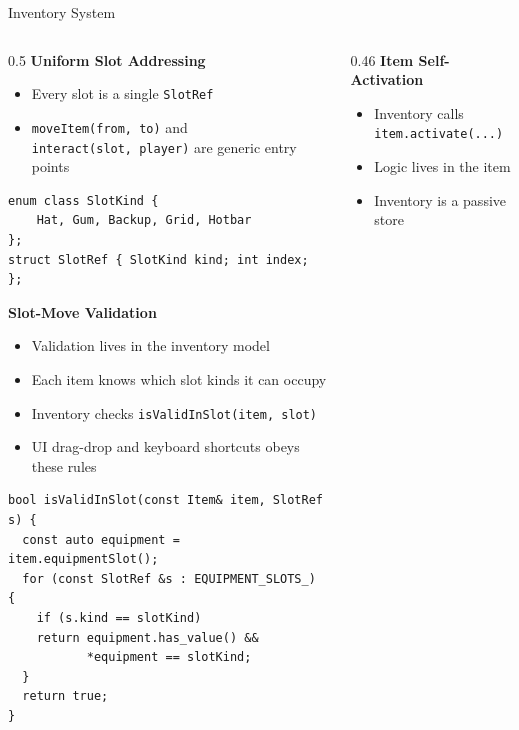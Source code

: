 \documentclass[11pt,t,usepdftitle=false,aspectratio=169]{beamer}
\begin{document}
\begin{frame}[fragile,shrink=30]{Inventory System}
	\lstset{basicstyle=\scriptsize\ttfamily}
	\begin{columns}[T]
		\begin{column}{0.5\textwidth}
			\small
			\textbf{Uniform Slot Addressing}
			\begin{itemize}
				\item Every slot is a single \texttt{SlotRef}
				\item \texttt{moveItem(from,~to)} and \texttt{interact(slot,~player)} are generic entry points
			\end{itemize}
			\vspace{-0.1em}
			\begin{lstlisting}
enum class SlotKind {
    Hat, Gum, Backup, Grid, Hotbar
};
struct SlotRef { SlotKind kind; int index; };
			\end{lstlisting}



			\vspace{0.5em}

			\textbf{Slot-Move Validation}
			\begin{itemize}
				\item Validation lives in the inventory model
				\item Each item knows which slot kinds it can occupy
				\item Inventory checks \texttt{isValidInSlot(item,~slot)}
				\item UI drag-drop and keyboard shortcuts obeys these rules
			\end{itemize}

			\vspace{-0.1em}
			\begin{lstlisting}
bool isValidInSlot(const Item& item, SlotRef s) {
  const auto equipment = item.equipmentSlot();
  for (const SlotRef &s : EQUIPMENT_SLOTS_) {
    if (s.kind == slotKind)
    return equipment.has_value() &&
           *equipment == slotKind;
  }
  return true;
}
			\end{lstlisting}

		\end{column}

		\begin{column}{0.46\textwidth}
			\small
			\textbf{Item Self-Activation}
			\begin{itemize}
				\item Inventory calls \texttt{item.activate(...)}
				\item Logic lives in the item
				\item Inventory is a passive store
			\end{itemize}


\end{column}
\end{columns}
\end{frame}
\end{document}
